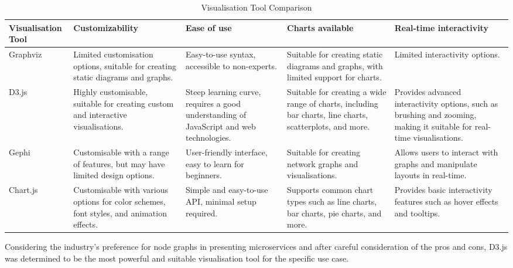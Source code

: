 \begin{table}[!htb] \caption{Visualisation Tool Comparison} \label{tab:visualisation_tool_comparison}
  \begin{center}
    \begin{tabular}[c]{p{4em}|p{7em}|p{7em}|p{7em}|p{7em}}
      \textbf{Visuali\-sation Tool} &
      \textbf{Customizability} &
      \textbf{Ease of use} &
      \textbf{Charts available} &
      \textbf{Real-time interactivity} \\
      \hline Graphviz &
        Limited customisation options, suitable for creating static diagrams and graphs. &
        Easy-to-use syntax, accessible to non-experts. &
        Suitable for creating static diagrams and graphs, with limited support for charts. &
        Limited interactivity options. \\
      \hline D3.js &
        Highly customisable, suitable for creating custom and interactive visualisations. &
        Steep learning curve, requires a good understanding of JavaScript and web technologies. &
        Suitable for creating a wide range of charts, including bar charts, line charts, scatterplots, and more. &
        Provides advanced interactivity options, such as brushing and zooming, making it suitable for real-time visualisations. \\
      \hline Gephi &
        Customisable with a range of features, but may have limited design options. &
        User-friendly interface, easy to learn for beginners. &
        Suitable for creating network graphs and visualisations. &
        Allows users to interact with graphs and manipulate layouts in real-time. \\
      \hline Chart.js &
        Customisable with various options for color schemes, font styles, and animation effects. &
        Simple and easy-to-use API, minimal setup required. &
        Supports common chart types such as line charts, bar charts, pie charts, and more. &
        Provides basic interactivity features such as hover effects and tooltips. \\
    \end{tabular}
  \end{center}
\end{table}

Considering the industry's preference for node graphs in presenting
microservices \cite{cerny2022microservice} and after careful consideration of
the pros and cons, D3.js was determined to be the most powerful and suitable
visualisation tool for the specific use case.

